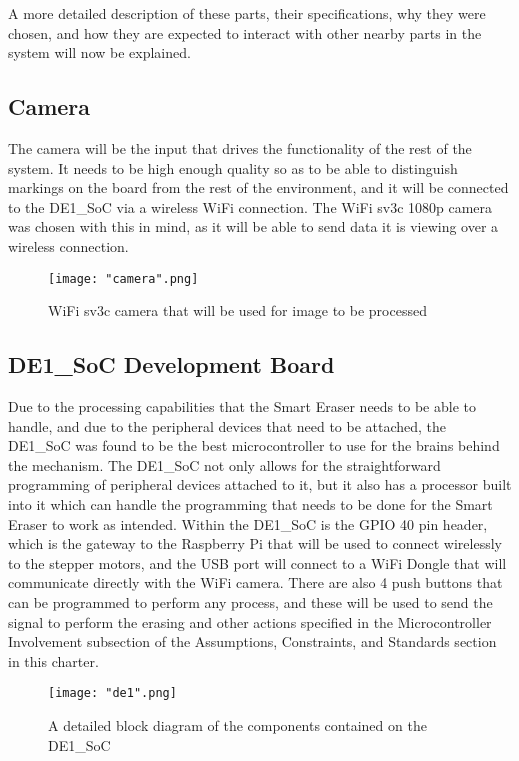 A more detailed description of these parts, their specifications, why they were chosen, and how they are expected to interact with other nearby parts in the system will now be explained.

\subsection{Camera}
The camera will be the input that drives the functionality of the rest of the system. It needs to be high enough quality so as to be able to distinguish markings on the board from the rest of the environment, and it will be connected to the DE1\_SoC via a wireless WiFi connection. The WiFi sv3c 1080p camera was chosen with this in mind, as it will be able to send data it is viewing over a wireless connection.

\begin{figure}[H]
	\centering
	{\texttt{[image: "camera".png]}}
	\caption{WiFi sv3c camera that will be used for image to be processed\cite{cam} }
	\label{fig:cam}
\end{figure}

\subsection{DE1\_SoC Development Board}
Due to the processing capabilities that the Smart Eraser needs to be able to handle, and due to the peripheral devices that need to be attached, the DE1\_SoC was found to be the best microcontroller to use for the brains behind the mechanism. The DE1\_SoC not only allows for the straightforward programming of peripheral devices attached to it, but it also has a processor built into it which can handle the programming that needs to be done for the Smart Eraser to work as intended. Within the DE1\_SoC is the GPIO 40 pin header, which is the gateway to the Raspberry Pi that will be used to connect wirelessly to the stepper motors, and the USB port will connect to a WiFi Dongle that will communicate directly with the WiFi camera. There are also 4 push buttons that can be programmed to perform any process, and these will be used to send the signal to perform the erasing and other actions specified in the Microcontroller Involvement subsection of the Assumptions, Constraints, and Standards section in this charter.

\begin{figure}[H]
	\centering
	{\texttt{[image: "de1".png]}}
	\caption{A detailed block diagram of the components 
		contained on the DE1\_SoC\cite{de1} }
	\label{fig:de1}
\end{figure}

